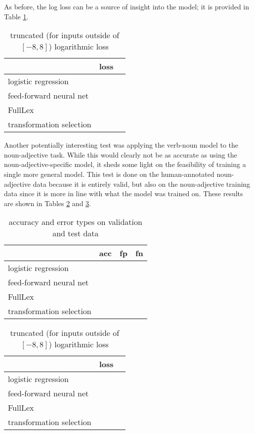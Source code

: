\documentclass[a4paper, 11pt]{scrartcl}
\begin{document}
As before, the log loss can be a source of insight into the model; it is provided in Table \ref{loss-vn}.

\begin{table}[]
	\centering
	\begin{tabular}{l|l|l}
		                         & loss      \\ \hline
		logistic regression      &           \\
		feed-forward neural net  &           \\
		FullLex                  &           \\
		transformation selection &
	\end{tabular}
	\caption{truncated (for inputs outside of $[-8, 8]$) logarithmic loss}
	\label{loss-vn}
\end{table}

Another potentially interesting test was applying the verb-noun model to the noun-adjective task. While this would clearly not be as accurate as using the noun-adjective-specific model, it sheds some light on the feasibility of training a single more general model. This test is done on the human-annotated noun-adjective data because it is entirely valid, but also on the noun-adjective training data since it is more in line with what the model was trained on. These results are shown in Tables \ref{accuracy-vn-na} and \ref{loss-vn-na}.

\begin{table}[]
	\centering
	\begin{tabular}{l|lll}
		                         & acc      & fp       & fn        \\ \hline
		logistic regression      &          &          &           \\
		feed-forward neural net  &          &          &           \\
		FullLex                  &          &          &           \\
		transformation selection &          &          &
	\end{tabular}
	\caption{accuracy and error types on validation and test data}
	\label{accuracy-vn-na}
\end{table}

\begin{table}[]
	\centering
	\begin{tabular}{l|l|l}
		                         & loss      \\ \hline
		logistic regression      &           \\
		feed-forward neural net  &           \\
		FullLex                  &           \\
		transformation selection &
	\end{tabular}
	\caption{truncated (for inputs outside of $[-8, 8]$) logarithmic loss}
	\label{loss-vn-na}
\end{table}
\end{document}
